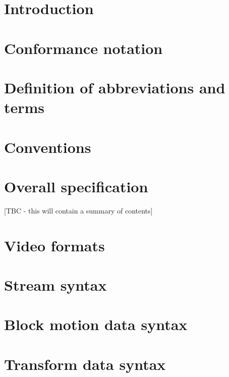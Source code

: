 
\section{Introduction}

\clearpage
\section{Conformance notation}

\clearpage
\section{Definition of abbreviations and terms}

\clearpage
\section{Conventions}

\clearpage
\section{Overall specification}
 [TBC - this will contain a summary of contents]

\clearpage
\section{Video formats}

\clearpage
\section{Stream syntax}

\clearpage
\section{Block motion data syntax}

\clearpage
\section{Transform data syntax}

